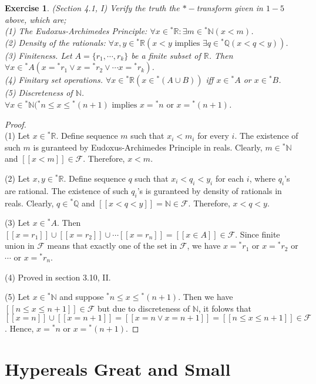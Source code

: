 \documentclass[a4paper, 11pt, openany]{book}
\theoremstyle{plain}
\newtheorem{exercise}{Exercise}[chapter]
\theoremstyle{plain}
\newcommand{\mc}{\mathcal}
\newcommand{\N}{\mathbb{N}}
\newcommand{\Q}{\mathbb{Q}}
\newcommand{\R}{\mathbb{R}}
\newcommand{\hyp}{{}^*}
\begin{document}
  \begin{exercise}
    (Section 4.1, I)
    Verify the truth the $*-$transform given in $1-5$ above, which are; \\
    (1) The Eudoxus-Archimedes Principle: $\forall x \in \hyp \R: \exists m \in \hyp \N (x<m)$.  \\
    (2) Density of the rationals: $\forall x, y \in \hyp \R (x<y \text{ implies } \exists q \in \hyp \Q (x<q<y))$. \\
    (3) Finiteness. Let $A=\{r_1,\cdots, r_k\}$ be a finite subset of $\R$. Then $\forall x \in \hyp A (x=\hyp r_1 \lor x=\hyp r_2 \lor \cdots x=\hyp r_k)$. \\
    (4) Finitary set operations. $\forall x \in \hyp \R (x \in \hyp (A \cup B))$ iff $x \in \hyp A$ or $x \in \hyp B$. \\
    (5) Discreteness of $\N$.  $\forall x \in \hyp \N (\hyp n \leq x \leq \hyp (n+1) \text{ implies } x= \hyp n \text{ or } x=\hyp (n+1)$.
  \end{exercise}
  \begin{proof} $ $ \\

    (1) Let $x \in \hyp \R$. Define sequence $m$ such that $x_i<m_i$ for every $i$. The existence of such $m$ is guranteed by Eudoxus-Archimedes Principle in reals. Clearly, $m \in \hyp \N$ and $[[x<m]] \in \mc{F}$. Therefore, $x<m$. 

    (2) Let $x,y \in \hyp \R$. Define sequence $q$ such that $x_i<q_i<y_i$ for each $i$, where $q_i$'s are rational. The existence of such $q_i$'s is guranteed by density of rationals in reals. Clearly, $q \in \hyp \Q$ and $[[x<q<y]]=\N \in \mc{F}$. Therefore, $x<q<y$. 

    (3) Let $x \in \hyp A$. Then $[[x=r_1]] \cup [[x=r_2]]\cup \cdots [[x=r_n]]=[[x \in A]] \in \mc{F}$. Since finite union in $\mc{F}$ means that exactly one of the set in $\mc{F}$, we have $x=\hyp r_1$ or $x=\hyp r_2$ or $\cdots$ or $x=\hyp r_n$.

    (4) Proved in section 3.10, II.

    (5) Let $x \in \hyp \N$ and suppose $\hyp n \leq x \leq \hyp (n+1)$. Then we have $[[n \leq x \leq n+1]] \in \mc{F}$ but due to discreteness of $\N$, it folows that $[[x=n]] \cup [[x=n+1]]=[[x=n \lor x=n+1]]=[[n \leq x \leq n+1]] \in \mc{F}$. Hence, $x=\hyp n$ or $x=\hyp(n+1)$.
  \end{proof}

\chapter{Hypereals Great and Small}
\end{document}
